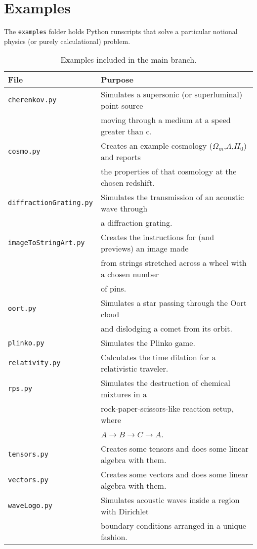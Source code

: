 \documentclass[12pt]{article}
\begin{document}
	\section{Examples}
	
The \texttt{examples} folder holds Python runscripts that solve a particular notional physics (or purely calculational) problem. 

\begin{table}[h!]
	\centering
	\begin{tabular}{|l|l|}
		\hline
		\textbf{File} & \textbf{Purpose}\\
		\hline
		\texttt{cherenkov.py} & Simulates a supersonic (or superluminal) point source \\
		& moving through a medium at a speed greater than c. \\
		\hline		
		\texttt{cosmo.py} & Creates an example cosmology ($\Omega_m$,$\Lambda$,$H_0$) and reports \\
		& the properties of that cosmology at the chosen redshift. \\
		\hline
		\texttt{diffractionGrating.py} & Simulates the transmission of an acoustic wave through \\
		& a diffraction grating.\\
		\hline
		\texttt{imageToStringArt.py} & Creates the instructions for (and previews) an image made \\
		& from strings stretched across a wheel with a chosen number \\
		& of pins. \\
		\hline
		\texttt{oort.py} & Simulates a star passing through the Oort cloud \\
		& and dislodging a comet from its orbit. \\
		\hline
		\texttt{plinko.py} & Simulates the Plinko game. \\
		\hline
		\texttt{relativity.py} & Calculates the time dilation for a relativistic traveler. \\
		\hline
		\texttt{rps.py} & Simulates the destruction of chemical mixtures in a \\
		& rock-paper-scissors-like reaction setup, where \\
		&  $A\to B\to C\to A$.\\
		\hline
		\texttt{tensors.py} & Creates some tensors and does some linear algebra with them.\\
		\hline
		\texttt{vectors.py} & Creates some vectors and does some linear algebra with them.\\
		\hline
		\texttt{waveLogo.py} & Simulates acoustic waves inside a region with Dirichlet\\
		& boundary conditions arranged in a unique fashion.\\
		\hline
	\end{tabular}
	\caption{Examples included in the main branch.}
	\label{tab:component-status}
\end{table}
\end{document}
